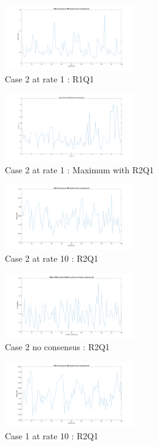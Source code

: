 \documentclass[twocolumn]{article}
\begin{document}
\begin{figure}[h!]
    \centering
    \includegraphics[width=0.50\textwidth]{Immagini/RMSIMMC2_1R1Q1.png}
    \caption{Case 2 at rate 1 : R1Q1}
    \label{fig:number}
\end{figure}
\begin{figure}[h!]
    \centering
    \includegraphics[width=0.50\textwidth]{Immagini/maxIMMC2_1R2Q1.png}
    \caption{Case 2 at rate 1 : Maximum with R2Q1}
    \label{fig:number}
\end{figure}
\begin{figure}[h!]
    \centering
    \includegraphics[width=0.50\textwidth]{Immagini/RMSIMMC2_10R2Q1.png}
    \caption{Case 2 at rate 10 : R2Q1}
    \label{fig:number}
\end{figure}
\begin{figure}[h!]
    \centering
    \includegraphics[width=0.50\textwidth]{Immagini/RMSnoconsC2R1Q2.png}
    \caption{Case 2 no consensus : R2Q1}
    \label{fig:number}
\end{figure}
\begin{figure}[h!]
    \centering
    \includegraphics[width=0.50\textwidth]{Immagini/RMSIMMC1_10R2Q1.png}
    \caption{Case 1 at rate 10 : R2Q1}
    \label{fig:number}
\end{figure}
\end{document}
